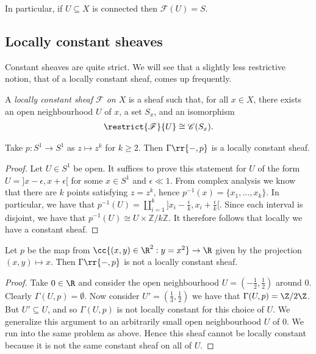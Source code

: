 \documentclass{article}
\begin{document}
In particular, if $U\subseteq X$ is connected then $\mathscr F(U)=S$.

\subsection{Locally constant sheaves}

Constant sheaves are quite strict. We will see that a slightly less
restrictive notion, that of a locally constant sheaf, comes up
frequently.

\begin{definition}
  A \emph{locally constant sheaf $\mathscr F$ on $X$} is a sheaf such that,
  for all $x\in X$, there exists an open neighbourhood $U$ of $x$,
  a set $S_x$, and an isomorphism
  \begin{align*}
    \restrict{\mathscr F}{U} \cong \mathscr C(S_x).
  \end{align*}
\end{definition}

\begin{example}
  \label{ex:locallyconstsheafs1}
  Take $p:S^1 \to S^1$ as $z\mapsto z^k$ for $k\geq 2$.
  Then $\Gamma\rr{-,p}$ is a locally constant sheaf.
  \begin{proof}
    Let $U \in S^1$ be open. It suffices to prove this statement for $U$ of the 
    form $U = ]x - \epsilon, x + \epsilon[$ for some $x \in S^1$ and $\epsilon \ll 1$. 
    From complex analysis we know that there are $k$ points satisfying $z = z^k$, 
    hence $p^{-1}(x) = \{x_1, ..., x_k\}$. In particular, we have that 
    $p^{-1}(U) = \amalg_{i=1}^k ]x_i - \frac{\epsilon}{k}, x_i + \frac{\epsilon}{k}[$. 
    Since each interval is disjoint, we have that 
    $p^{-1}(U) \cong U \times \mathbb{Z}/k\mathbb{Z}$. 
    It therefore follows that locally we have a constant sheaf.\missingproof
  \end{proof}
\end{example}

\begin{nonexample}
  Let $p$ be the map from $\cc{(x, y) \in \R^2 : y = x^2} \to \R$ given 
  by the projection $(x, y) \mapsto x$. Then $\Gamma\rr{-,p}$ is not a locally constant sheaf.
  \begin{proof}
    Take $0 \in \R$ and consider the open neighbourhood $U = (-\frac{1}{2}, \frac{1}{2})$ around $0$.
    Clearly $\Gamma(U, p) = \emptyset$. Now consider $U' = (\frac{1}{3}, \frac{1}{2})$
    we have that $\Gamma(U, p) = \Z/2\Z$. But $U' \subseteq U$,
    and so $\Gamma(U,p)$ is not locally constant for this choice of $U$.
    We generalize this argument to an arbitrarily small open neighbourhood $U$ of $0$. 
    We run into the same problem as above. Hence this sheaf cannot be locally 
    constant because it is not the same constant sheaf on all of $U$.
  \end{proof}
\end{nonexample}
\end{document}
